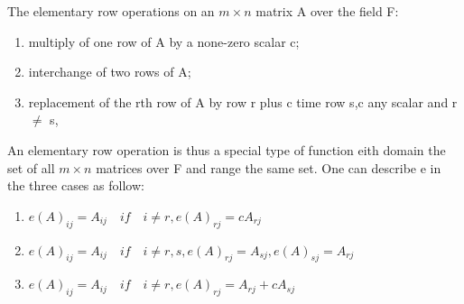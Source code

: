 \documentclass[11pt, a4paper, oneside,UTF8]{ctexbook}
\newtheorem[M]{theorem}{Theorem}[section]
\newtheorem[M]{lemma}[theorem]{Lemma}
\newtheorem[M]{proposition}[theorem]{Proposition}
\newtheorem[M]{corollary}[theorem]{Corollary}
\newtheorem[M]{definition}{Definition}[section]
\newtheorem[M]{example}{Example}[section]
\newtheorem[M]{remark}{Remark}[section]
\begin{document}
The elementary row operations on an $m \times n$ matrix A over the field F:
\begin{enumerate}
	\item multiply of one row of A by a none-zero scalar c;
	\item interchange of two rows of A;
	\item replacement of the rth row of A by row r plus c time row s,c any scalar and r $\neq$ s,
\end{enumerate}

An elementary row operation is thus a special type of function eith domain the set of all $m \times n$ matrices over F and range the same set.
One can describe e in the three cases as follow:
\begin{enumerate}
	\item $e(A)_{ij} = A_{ij} \quad if \quad  i \neq r ,e(A)_{rj} = cA_{rj}$
	\item $e(A)_{ij} = A_{ij} \quad if \quad  i \neq r,s ,e(A)_{rj} = A_{sj},e(A)_{sj} = A_{rj}$
	\item $e(A)_{ij} = A_{ij} \quad if \quad  i \neq r ,e(A)_{rj} = A_{rj}+cA_{sj}$
	      \label{eq:elementary_row_operations describe}
\end{enumerate}
\end{document}
